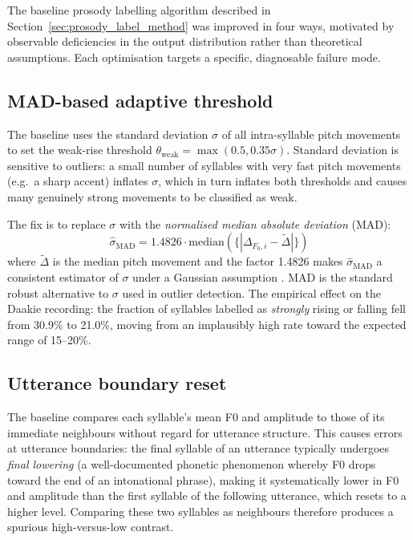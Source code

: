 The baseline prosody labelling algorithm described in
Section~\ref{sec:prosody_label_method} was improved in four ways, motivated by
observable deficiencies in the output distribution rather than theoretical
assumptions. Each optimisation targets a specific, diagnosable failure mode.

\subsection{MAD-based adaptive threshold}

The baseline uses the standard deviation $\sigma$ of all intra-syllable pitch
movements to set the weak-rise threshold $\theta_{\mathrm{weak}} = \max(0.5,
0.35\sigma)$. Standard deviation is sensitive to outliers: a small number of
syllables with very fast pitch movements (e.g.\ a sharp accent) inflates
$\sigma$, which in turn inflates both thresholds and causes many genuinely
strong movements to be classified as weak.

The fix is to replace $\sigma$ with the \emph{normalised median absolute
deviation} (MAD):
\begin{equation}
  \hat{\sigma}_{\mathrm{MAD}} = 1.4826 \cdot \mathrm{median}\!\left(
    \{|\Delta_{F_0,i} - \tilde{\Delta}|\}\right)
\end{equation}
where $\tilde{\Delta}$ is the median pitch movement and the factor 1.4826
makes $\hat{\sigma}_{\mathrm{MAD}}$ a consistent estimator of $\sigma$ under a
Gaussian assumption \cite{rousseeuw1993alternatives}. MAD is the standard robust
alternative to $\sigma$ used in outlier detection. The empirical effect on the
Daakie recording: the fraction of syllables labelled as \emph{strongly} rising
or falling fell from 30.9\% to 21.0\%, moving from an implausibly high rate
toward the expected range of 15--20\%.

\subsection{Utterance boundary reset}

The baseline compares each syllable's mean F0 and amplitude to those of its
immediate neighbours without regard for utterance structure. This causes errors
at utterance boundaries: the final syllable of an utterance typically undergoes
\emph{final lowering} (a well-documented phonetic phenomenon whereby F0 drops
toward the end of an intonational phrase), making it systematically lower in F0
and amplitude than the first syllable of the following utterance, which resets
to a higher level. Comparing these two syllables as neighbours therefore produces
a spurious high-versus-low contrast.

